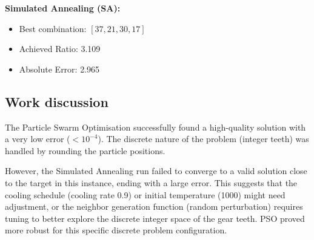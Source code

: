 \textbf{Simulated Annealing (SA):}
\begin{itemize}
    \item Best combination: $[37, 21, 30, 17]$
    \item Achieved Ratio: 3.109
    \item Absolute Error: 2.965
\end{itemize}

\subsection{Work discussion}
The Particle Swarm Optimisation successfully found a high-quality solution with a very low error ($< 10^{-4}$). The discrete nature of the problem (integer teeth) was handled by rounding the particle positions.

However, the Simulated Annealing run failed to converge to a valid solution close to the target in this instance, ending with a large error. This suggests that the cooling schedule (cooling rate 0.9) or initial temperature (1000) might need adjustment, or the neighbor generation function (random perturbation) requires tuning to better explore the discrete integer space of the gear teeth. PSO proved more robust for this specific discrete problem configuration.
